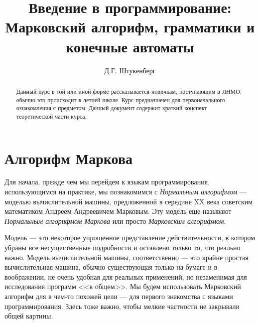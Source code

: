 \documentclass[12pt,a4paper,oneside]{article}
\begin{document}
\author{Д.Г. Штукенберг}
\title{Введение в программирование: Марковский алгорифм, грамматики и конечные автоматы}
\maketitle

\theoremstyle{definition}
\newtheorem{definition}{Определение}[section]
\theoremstyle{example}
\newtheorem{example}{Пример}[section]
\newtheorem{theorem}{Теорема}[section]

\begin{abstract}
Данный курс в той или иной форме рассказывается новичкам, поступающим в ЛНМО;
обычно это происходит в летней школе. 
Курс предназначен для первоначального ознакомления с предметом.
Данный документ содержит краткий конспект теоретической части курса.
\end{abstract}

\section{Алгорифм Маркова}

Для начала, прежде чем мы перейдем к языкам программирования, использующимся 
на практике, мы познакомимся с \emph{Нормальным алгорифмом} --- моделью 
вычислительной машины, предложенной в середине XX века советским математиком 
Андреем Андреевичем Марковым. Эту модель еще называют \emph{Нормальным 
алгорифмом Маркова} или просто \emph{Марковским алгорифмом}.

Модель --- это некоторое упрощенное представление действительности, в котором
убраны все несущественные подробности и оставлено только то, что реально важно.
Модель вычислительной машины, соответственно --- это крайне простая
вычислительная машина, обычно существующая только на бумаге и в воображении,
не очень удобная для реальных применений, но незаменимая для исследования 
программ <<в общем>>. Мы будем использовать Марковский алгорифм для в чем-то
похожей цели --- для первого знакомства с языками программирования.
Здесь тоже важно, чтобы мелкие частности не закрывали общей картины.
\end{document}
